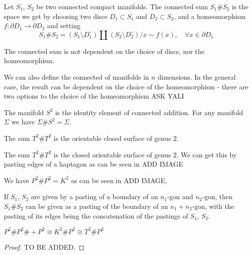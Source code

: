 \documentclass[11pt,a4paper]{article}
\begin{document}
\begin{definition}
  Let $S_1$, $S_2$ be two connected compact manifolds.
  The connected sum $S_1 \# S_2$ is the space we get by
  choosing two discs $D_1 \subset S_1$ and $D_2 \subset S_2$,
  and a homeomorphism $f \colon \partial D_1 \to \partial D_2$ and setting
  \[
    S_1 \# S_2 = 
    (S_1 \setminus D_1^{\circ}) \amalg
    (S_2 \setminus D_2^{\circ}) \slash x \sim f(x),
    \quad \forall x \in \partial D_1
  \]
\end{definition}
\begin{remark}
  The connected sum is not dependent on the choice of discs,
  nor the homeomorphism.
\end{remark}
\begin{remark}
  We can also define the connected of manifolds in $n$ dimensions.
  In the general case, the result can be dependent on the choice of the
  homeomorphism - there are two options to the choice of the homeomorphism
  ASK YALI
\end{remark}


\begin{example}
  The manifold $S^2$ is the identity element of connected addition.
  For any manifold $\Sigma$ we have $\Sigma \# S^2 = \Sigma$.
\end{example}
\begin{example}
  The sum $T^2 \# T^2$ is the orientable closed surface of genus $2$.
\end{example}
\begin{example}
  The sum $T^2 \# T^2$ is the closed orientable surface of genus $2$.
  We can get this by pasting edges of a haptagon as can be seen in ADD IMAGE
\end{example}
\begin{example}
  We have $P^2 \# P^2 = K^2$ as can be seen in ADD IMAGE.
\end{example}
\begin{example}
\end{example}

\begin{remark}
  If $S_1$, $S_2$ are given by a pasting of a boundary of an $n_1$-gon and
  $n_2$-gon, then $S_1 \# S_2$ can be given as a pasting of the boundary of
  an $n_1 + n_2$-gon, with the pasting of its edges being the concatenation
  of the pastings of $S_1$, $S_2$.
\end{remark}

\begin{proposition}
  \label{prop:pp-kp-tp}
  $P^2 \# P^2 \# + P^2 \cong K^2 \# P^2 \cong T^2 \# P^2$
\end{proposition}
\begin{proof}
  TO BE ADDED.
\end{proof}
\end{document}
